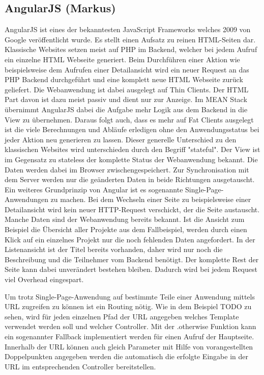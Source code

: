\subsection{AngularJS (Markus)}\label{angularjs-markus}

AngularJS ist eines der bekanntesten JavaScript Frameworks welches 2009 von Google veröffentlicht wurde. 
Es stellt einen Aufsatz zu reinen HTML-Seiten dar. 
Klassische Websites setzen meist auf PHP im Backend, welcher bei jedem Aufruf ein einzelne HTML Webseite generiert.
Beim Durchführen einer Aktion wie beispielsweise dem Aufrufen einer Detailansicht wird ein neuer Request an das PHP Backend durchgeführt und eine komplett neue HTML Webseite zurück geliefert.
Die Webanwendung ist dabei ausgelegt auf Thin Clients.
Der HTML Part davon ist dazu meist passiv und dient nur zur Anzeige.
Im MEAN Stack übernimmt AngularJS dabei die Aufgabe mehr Logik aus dem Backend in die View zu übernehmen.
Daraus folgt auch, dass es mehr auf Fat Clients ausgelegt ist die viele Berechnungen und Abläufe erledigen ohne den Anwendungsstatus bei jeder Aktion neu generieren zu lassen.
Dieser generelle Unterschied zu den klassischen Websites wird unterschieden durch den Begriff "stateful".
Der View ist im Gegensatz zu stateless der komplette Status der Webanwendung bekannt.
Die Daten werden dabei im Browser zwischengespeichert.
Zur Synchronisation mit dem Server werden nur die geänderten Daten in beide Richtungen ausgetauscht.
Ein weiteres Grundprinzip von Angular ist es sogenannte Single-Page-Anwendungen zu machen.
Bei dem Wechseln einer Seite zu beispielsweise einer Detailansicht wird kein neuer HTTP-Request verschickt, der die Seite austauscht.
Manche Daten sind der Webanwendung bereits bekannt.
Ist die Ansicht zum Beispiel die Übersicht aller Projekte aus dem Fallbeispiel, werden durch einen Klick auf ein einzelnes Projekt nur die noch fehlenden Daten angefordert.
In der Listenansicht ist der Titel bereits vorhanden, daher wird nur noch die Beschreibung und die Teilnehmer vom Backend benötigt.
Der komplette Rest der Seite kann dabei unverändert bestehen bleiben.
Dadurch wird bei jedem Request viel Overhead eingespart.

Um trotz Single-Page-Anwendung auf bestimmte Teile einer Anwendung mittels URL zugreifen zu können ist ein Routing nötig.
Wie in dem Beispiel TODO zu sehen, wird für jeden einzelnen Pfad der URL angegeben welches Template verwendet werden soll und welcher Controller.
Mit der .otherwise Funktion kann ein sogenannter Fallback implementiert werden für einen Aufruf der Hauptseite.
Innerhalb der URL können auch gleich Parameter mit Hilfe von vorangestellten Doppelpunkten angegeben werden die automatisch die erfolgte Eingabe in der URL im entsprechenden Controller bereitstellen.

